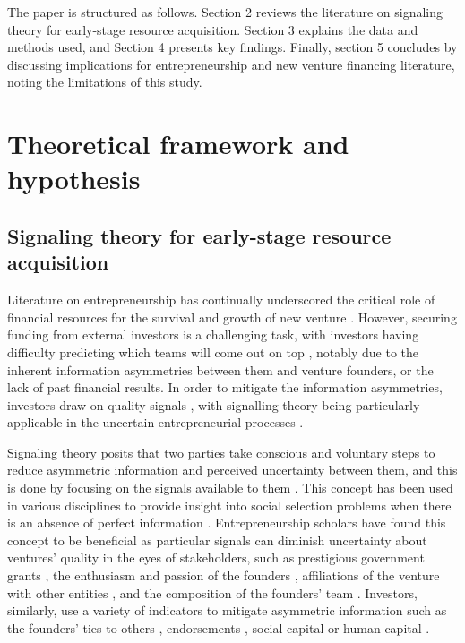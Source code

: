 \documentclass[12pt]{article}
\begin{document}
The paper is structured as follows. Section 2 reviews the literature on signaling theory for early-stage resource acquisition. Section 3 explains the data and methods used, and Section 4 presents key findings. Finally, section 5 concludes by discussing implications for entrepreneurship and new venture financing literature, noting the limitations of this study.

\section{Theoretical framework and hypothesis}

\subsection{Signaling theory for early-stage resource acquisition}

Literature on entrepreneurship has continually underscored the critical role of financial resources for the survival and growth of new venture \citep{cooper1994initial, drover2017review, klein2020start}. However, securing funding from external investors is a challenging task, with investors having difficulty predicting which teams will come out on top \citep{ghassemiautomated}, notably due to the inherent information asymmetries between them and venture founders, or the lack of past financial results. In order to mitigate the information asymmetries, investors draw on quality-signals \citep{ko2018signaling, subramanian2022backing}, with signalling theory being particularly applicable in the uncertain entrepreneurial processes \citep{spence1978job}.

Signaling theory posits that two parties take conscious and voluntary steps to reduce asymmetric information and perceived uncertainty between them, and this is done by focusing on the signals available to them \citep{spence1974market}. This concept has been used in various disciplines to provide insight into social selection problems when there is an absence of perfect information \citep{connelly2011signaling, colombo2021use}. Entrepreneurship scholars have found this concept to be beneficial as particular signals can diminish uncertainty about ventures' quality in the eyes of stakeholders, such as prestigious government grants \citep{islam2018signaling}, the enthusiasm and passion of the founders \citep{chen2009entrepreneur}, affiliations of the venture with other entities \citep{plummer2016better}, and the composition of the founders' team \citep{ko2018signaling}. Investors, similarly, use a variety of indicators to mitigate asymmetric information such as the founders' ties to others \citep{shane2002network}, endorsements \citep{courtney2017resolving, janney2006moderating, plummer2016better, gasiorowski2022pay}, social capital \citep{shane2002organizational} or human capital \citep{beckman2007early}.
\end{document}
